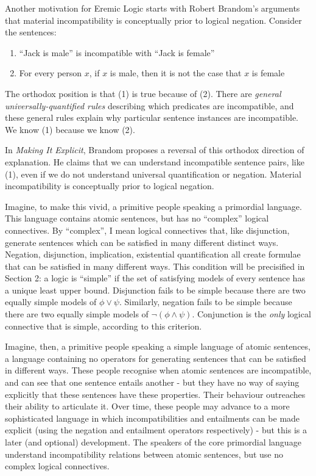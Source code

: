 \NI Another motivation for Eremic Logic starts with Robert Brandom's
arguments that material incompatibility is conceptually prior to
logical negation.  Consider the sentences:
\begin{enumerate}

\item ``Jack is male'' is incompatible with ``Jack is female''
\item For every person $x$, if $x$ is male, then it is not the case that $x$ is female

\end{enumerate}

\NI The orthodox position is that (1) is true because of (2).  There
are \emph{general universally-quantified rules} describing which
predicates are incompatible, and these general rules explain why
particular sentence instances are incompatible.  We know (1) because
we know (2).

\NI In \emph{Making It Explicit}\cite{brandom2}, Brandom proposes a reversal of this
orthodox direction of explanation.  He claims that we can understand
incompatible sentence pairs, like (1), even if we do not understand
universal quantification or negation.  Material incompatibility is
conceptually prior to logical negation.

\NI Imagine, to make this vivid, a primitive people speaking a
primordial language.  This language contains atomic sentences, but has
no ``complex'' logical connectives.  By ``complex'', I mean logical
connectives that, like disjunction, generate sentences which can be
satisfied in many different distinct ways.  Negation, disjunction,
implication, existential quantification all create formulae that can
be satisfied in many different ways. This condition will be
precisified in Section 2: a logic is ``simple'' if the set of
satisfying models of every sentence has a unique least upper
bound. Disjunction fails to be simple because there are two equally
simple models of $\phi \lor \psi$. Similarly, negation fails to be simple
because there are two equally simple models of $\neg (\phi \land
\psi)$. Conjunction is the \emph{only} logical connective that is simple,
according to this criterion.

\NI Imagine, then, a primitive people speaking a simple language of
atomic sentences, a language containing no operators for generating
sentences that can be satisfied in different ways.  These people
recognise when atomic sentences are incompatible, and can see that one
sentence entails another - but they have no way of saying explicitly
that these sentences have these properties.  Their behaviour
outreaches their ability to articulate it.  Over time, these people
may advance to a more sophisticated language in which
incompatibilities and entailments can be made explicit (using the
negation and entailment operators respectively) - but this is a later
(and optional) development. The speakers of the core primordial
language understand incompatibility relations between atomic
sentences, but use no complex logical connectives.

